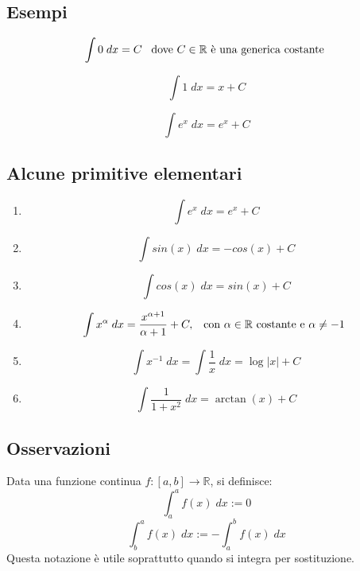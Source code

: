 \documentclass[a4paper]{article}
\theoremstyle{break}
\theoremstyle{break}
\theoremstyle{break}
\theoremstyle{break}
\begin{document}
\subsection{Esempi}
\begin{figure}[H]
  \begin{example}
    \[
      \int 0\;dx = C \;\;\; \text{dove \( C \in  \mathbb{R} \) è una generica costante }
    \] 
  \end{example}
\end{figure}

\begin{figure}[H]
  \begin{example}
    \[
      \int 1\;dx = x + C
    \] 
  \end{example}
\end{figure}

\begin{figure}[H]
  \begin{example}
    \[
      \int e^x\;dx = e^x + C
    \] 
  \end{example}
\end{figure}

\subsection{Alcune primitive elementari}
\begin{enumerate}
  \item \[
      \int e^x\;dx = e^x + C
    \] 
  \item \[
      \int sin(x)\;dx = -cos(x) + C
    \] 
  \item \[
      \int cos(x)\;dx = sin(x) + C
    \] 
  \item \[
      \int x^\alpha\; dx = \frac{x^{\alpha+1}}{\alpha+1} + C,\;\;\; \text{con \( \alpha \in \mathbb{R} \) costante e \( \alpha \neq -1 \) }
    \] 
  \item \[
      \int x^{-1}\;dx = \int \frac{1}{x}\;dx = \log|x| + C
    \] 
  \item \[
      \int \frac{1}{1+x^2}\;dx = \arctan(x) + C
    \] 
\end{enumerate}

\subsection{Osservazioni}
Data una funzione continua \( f: [a,b] \to \mathbb{R} \), si definisce:
\[
  \int_{a}^{a} f(x)\;dx := 0
\] 
\[
  \int_{b}^{a} f(x)\;dx := - \int_{a}^{b} f(x)\;dx
\] 
Questa notazione è utile soprattutto quando si integra per sostituzione.
\end{document}
